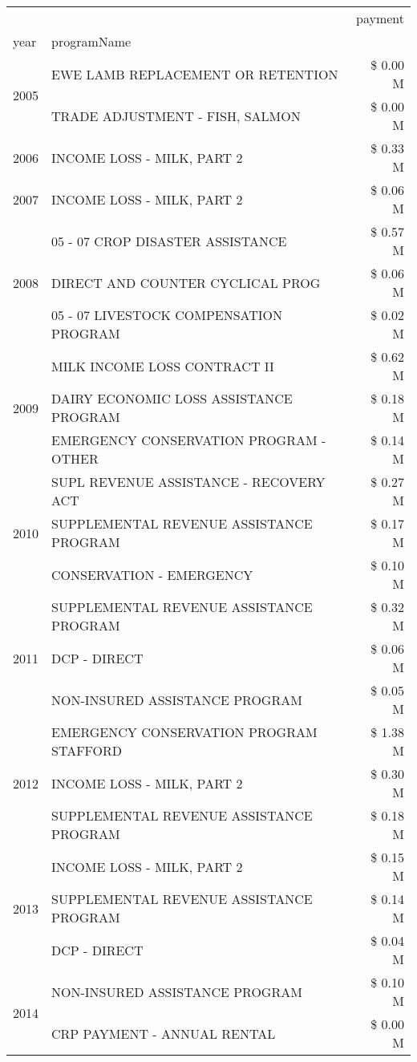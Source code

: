 \begin{tabular}{llr}
\toprule
 &  & payment \\
year & programName &  \\
\midrule
\multirow[t]{2}{*}{2005} & EWE LAMB REPLACEMENT OR RETENTION & \$ 0.00 M \\
 & TRADE ADJUSTMENT - FISH, SALMON & \$ 0.00 M \\
\cline{1-3}
2006 & INCOME LOSS - MILK, PART 2 & \$ 0.33 M \\
\cline{1-3}
2007 & INCOME LOSS - MILK, PART 2 & \$ 0.06 M \\
\cline{1-3}
\multirow[t]{3}{*}{2008} & 05 - 07 CROP DISASTER ASSISTANCE & \$ 0.57 M \\
 & DIRECT AND COUNTER CYCLICAL PROG & \$ 0.06 M \\
 & 05 - 07 LIVESTOCK COMPENSATION PROGRAM & \$ 0.02 M \\
\cline{1-3}
\multirow[t]{3}{*}{2009} & MILK INCOME LOSS CONTRACT II & \$ 0.62 M \\
 & DAIRY ECONOMIC LOSS ASSISTANCE PROGRAM & \$ 0.18 M \\
 & EMERGENCY CONSERVATION PROGRAM - OTHER & \$ 0.14 M \\
\cline{1-3}
\multirow[t]{3}{*}{2010} & SUPL REVENUE ASSISTANCE - RECOVERY ACT & \$ 0.27 M \\
 & SUPPLEMENTAL REVENUE ASSISTANCE PROGRAM & \$ 0.17 M \\
 & CONSERVATION - EMERGENCY & \$ 0.10 M \\
\cline{1-3}
\multirow[t]{3}{*}{2011} & SUPPLEMENTAL REVENUE ASSISTANCE PROGRAM & \$ 0.32 M \\
 & DCP - DIRECT & \$ 0.06 M \\
 & NON-INSURED ASSISTANCE PROGRAM & \$ 0.05 M \\
\cline{1-3}
\multirow[t]{3}{*}{2012} & EMERGENCY CONSERVATION PROGRAM STAFFORD & \$ 1.38 M \\
 & INCOME LOSS - MILK, PART 2 & \$ 0.30 M \\
 & SUPPLEMENTAL REVENUE ASSISTANCE PROGRAM & \$ 0.18 M \\
\cline{1-3}
\multirow[t]{3}{*}{2013} & INCOME LOSS - MILK, PART 2 & \$ 0.15 M \\
 & SUPPLEMENTAL REVENUE ASSISTANCE PROGRAM & \$ 0.14 M \\
 & DCP - DIRECT & \$ 0.04 M \\
\cline{1-3}
\multirow[t]{3}{*}{2014} & NON-INSURED ASSISTANCE PROGRAM & \$ 0.10 M \\
 & CRP PAYMENT - ANNUAL RENTAL & \$ 0.00 M \\

\end{tabular}
